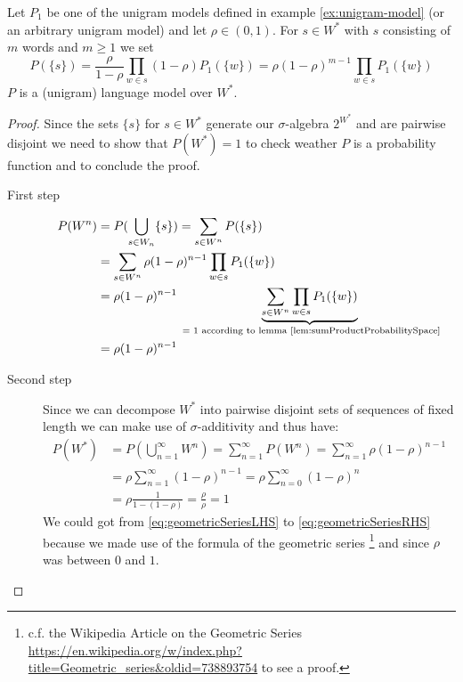 \documentclass[•]{book}
\begin{document}
\begin{theorem}\label{thm:unigram-lm}
Let $P_1$ be one of the unigram models defined in example \ref{ex:unigram-model} (or an arbitrary unigram model) and let $\rho \in (0,1)$.
For $s\in W^{*}$ with $s$ consisting of $m$ words and $m\geq 1$ we set
\begin{equation}
P(\{s\}) = \frac{\rho}{1-\rho}\prod_{w\in s}(1-\rho)P_1(\{w\}) =  \rho(1-\rho)^{m-1}\prod_{w\in s}P_1(\{w\})
\end{equation}
$P$ is a (unigram) language model over $W^{*}$.
\begin{proof}
Since the sets $\{s\}$ for $s\in W^{*}$ generate our $\sigma$-algebra $2^{W^{*}}$ and are pairwise disjoint we need to show that $P(W^{*})=1$ to check weather $P$ is a probability function and to conclude the proof.

\begin{description}
\item[First step] 
\begin{align}
P(W^n) & = P(\bigcup_{s\in W_n} \{s\}) = \sum_{s\in W^n}P(\{s\}) \\
 & = \sum_{s\in W^n}\rho(1-\rho)^{n-1}\prod_{w\in s}P_1(\{w\}) \\
 & = \rho(1-\rho)^{n-1} \underbrace{\sum_{s\in W^n}\prod_{w\in s}P_1(\{w\})}_{\text{ = 1 according to lemma \ref{lem:sumProductProbabilitySpace}}} \\
 & = \rho(1-\rho)^{n-1}
\end{align}

\item[Second step] Since we can decompose $W^{*}$ into pairwise disjoint sets of sequences of fixed length we can make use of $\sigma$-additivity and thus have: 
\begin{align}
P(W^{*}) & = P(\bigcup_{n=1}^\infty W^n) = \sum_{n=1}^\infty P(W^n) = \sum_{n=1}^\infty \rho(1-\rho)^{n-1} \\
 & =  \rho \sum_{n=1}^\infty(1-\rho)^{n-1} = \rho \sum_{n=0}^\infty(1-\rho)^{n} \label{eq:geometricSeriesLHS} \\
 &  = \rho \frac{1}{1-(1-\rho)} = \frac{\rho}{\rho} = 1 \label{eq:geometricSeriesRHS}
\end{align}
We could got from \ref{eq:geometricSeriesLHS} to \ref{eq:geometricSeriesRHS} because we made use of the formula of the geometric series \footnote{c.f. the Wikipedia Article on the Geometric Series \url{https://en.wikipedia.org/w/index.php?title=Geometric_series&oldid=738893754} to see a proof. } and since $\rho$ was between $0$ and $1$.
\end{description} 
\end{proof}
\end{theorem}
\end{document}
